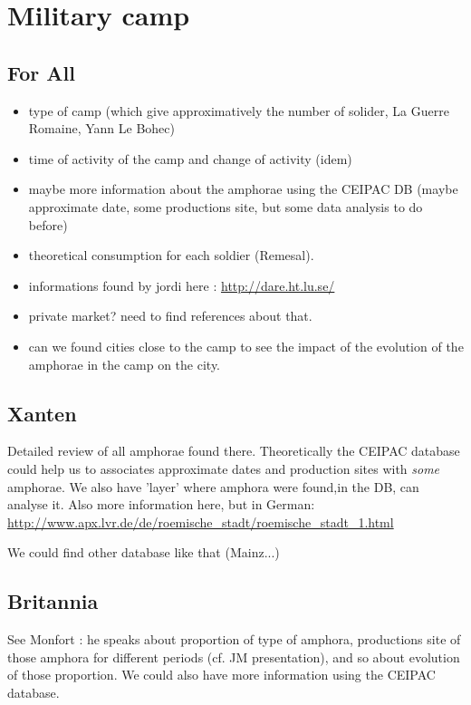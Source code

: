 
\section*{Military camp}

\subsection*{For All}
\begin{itemize}
        \item type of camp (which give approximatively the number of solider, La Guerre Romaine, Yann Le Bohec)
        \item time of activity of the camp and change of activity (idem)
        \item maybe more information about the amphorae using the CEIPAC DB (maybe approximate date, some productions site, but some data analysis to do before)
        \item theoretical consumption for each soldier (Remesal).
	\item informations found by jordi here : \url{http://dare.ht.lu.se/}
	\item private market? need to find references about that.
\item can we found cities close to the camp to see the impact of the evolution of the amphorae in the camp on the city.
\end{itemize}
\subsection*{Xanten}

Detailed review of all amphorae found there. Theoretically the CEIPAC database could help us to associates approximate dates and production sites with \emph{some} amphorae. We also have 'layer' where amphora were found,in the DB, can analyse it. Also more information here, but in German: \url{http://www.apx.lvr.de/de/roemische_stadt/roemische_stadt_1.html}

We could find other database like that (Mainz...)

\subsection*{Britannia}
        See Monfort : he speaks about proportion of type of amphora, productions site of those amphora for different periods (cf. JM presentation), and so about evolution of those proportion. We could also have more information using the CEIPAC database.

